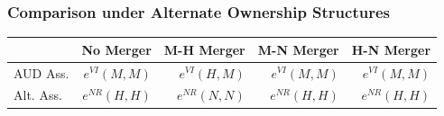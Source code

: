 \begin{frame}
\frametitle{Comparison under Alternate Ownership Structures}
\begin{table}[htbp]
  \begin{center}
  \label{tab:merger}
    \begin{tabular}{|l | rrrr|}
\hline
          & No Merger & M-H Merger & M-N Merger & H-N Merger \\
\hline
     AUD Ass. & $e^{VI}(M,M)$ & $e^{VI}(H,M)$ & $e^{VI}(M,M)$ & $e^{VI}(M,M)$ \\
    Alt. Ass. & $e^{NR}(H,H)$ &  $e^{NR}(N,N)$ &  $e^{NR}(H,H)$ &  $e^{NR}(H,H)$ \\
    \hline
 

\end{tabular}
\end{center}
\end{table}
\end{frame}
